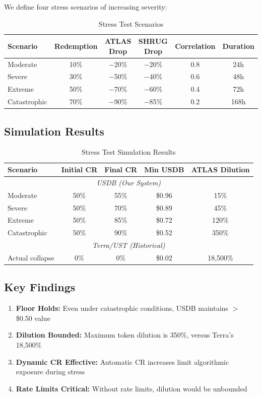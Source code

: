 \documentclass[11pt,a4paper]{article}
\begin{document}
We define four stress scenarios of increasing severity:

\begin{table}[H]
\centering
\caption{Stress Test Scenarios}
\begin{tabular}{@{}lccccc@{}}
\toprule
\textbf{Scenario} & \textbf{Redemption} & \textbf{ATLAS Drop} & \textbf{SHRUG Drop} & \textbf{Correlation} & \textbf{Duration} \\ \midrule
Moderate & 10\% & $-$20\% & $-$20\% & 0.8 & 24h \\
Severe & 30\% & $-$50\% & $-$40\% & 0.6 & 48h \\
Extreme & 50\% & $-$70\% & $-$60\% & 0.4 & 72h \\
Catastrophic & 70\% & $-$90\% & $-$85\% & 0.2 & 168h \\ \bottomrule
\end{tabular}
\end{table}

\subsection{Simulation Results}

\begin{table}[H]
\centering
\caption{Stress Test Simulation Results}
\begin{tabular}{@{}lcccc@{}}
\toprule
\textbf{Scenario} & \textbf{Initial CR} & \textbf{Final CR} & \textbf{Min USDB} & \textbf{ATLAS Dilution} \\ \midrule
\multicolumn{5}{c}{\textit{USDB (Our System)}} \\
Moderate & 50\% & 55\% & \$0.96 & 15\% \\
Severe & 50\% & 70\% & \$0.89 & 45\% \\
Extreme & 50\% & 85\% & \$0.72 & 120\% \\
Catastrophic & 50\% & 90\% & \$0.52 & 350\% \\
\midrule
\multicolumn{5}{c}{\textit{Terra/UST (Historical)}} \\
Actual collapse & 0\% & 0\% & \$0.02 & 18,500\% \\ \bottomrule
\end{tabular}
\end{table}

\subsection{Key Findings}

\begin{enumerate}
    \item \textbf{Floor Holds:} Even under catastrophic conditions, USDB maintains $>$ \$0.50 value
    \item \textbf{Dilution Bounded:} Maximum token dilution is 350\%, versus Terra's 18,500\%
    \item \textbf{Dynamic CR Effective:} Automatic CR increases limit algorithmic exposure during stress
    \item \textbf{Rate Limits Critical:} Without rate limits, dilution would be unbounded
\end{enumerate}
\end{document}
